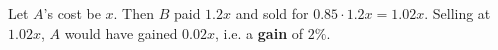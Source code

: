 Let $A$'s cost be $x$. Then $B$ paid $1.2x$ and sold for $0.85\cdot1.2x=1.02x$. Selling at $1.02x$, $A$ would have gained $0.02x$, i.e. a \textbf{gain} of $\boxed{2\%}$.
